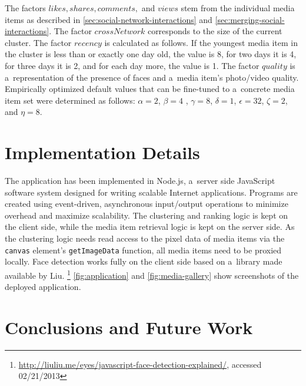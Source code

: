 \documentclass{sig-alternate}
\newcommand{\inlinelistingsize}{\fontsize{8pt}{11pt}}
\let\oldurl\url
\renewcommand{\url}[1]{\inlinelistingsize\oldurl{#1}}
\begin{document}
The factors $ \mathit{likes}, \mathit{shares}, \mathit{comments},$ and $ \mathit{views} $
stem from the individual media items as described in \autoref{sec:social-network-interactions}
and \autoref{sec:merging-social-interactions}.
The factor $ \mathit{crossNetwork} $ corresponds to the size of the current cluster. 
The factor $ \mathit{recency} $ is calculated as follows.
If the youngest media item in the cluster is less than or exactly one day old,
the value is 8, for two days it is 4, for three days it is 2,
and for each day more, the value is 1.
The factor $ \mathit{quality} $ is a~representation of the
presence of faces and a~media item's photo/video quality.
Empirically optimized default values
that can be fine-tuned to a~concrete media item set
were determined as follows:
$ \alpha = 2 $, $ \beta = 4 $ , $ \gamma = 8 $, $ \delta = 1 $,
$ \epsilon = 32 $, $ \zeta = 2 $, and $ \eta = 8 $.

\section{Implementation Details}

The application has been implemented in Node.js,
a~server side JavaScript software system
designed for writing scalable Internet applications.
Programs are created using event-driven, asynchronous input/output operations
to minimize overhead and maximize scalability.
The clustering and ranking logic is kept on the client side,
while the media item retrieval logic is kept on the server side.
As the clustering logic needs read access to the pixel data of media items via
the \texttt{canvas} element's \texttt{getImageData} function,
all media items need to be proxied locally.
Face detection works fully on the client side based on a~library
made available by Liu.%
\footnote{\url{http://liuliu.me/eyes/javascript-face-detection-explained/},
accessed 02/21/2013}
\autoref{fig:application} and \autoref{fig:media-gallery} show screenshots
of the deployed application.

\section{Conclusions and Future Work}
\end{document}
